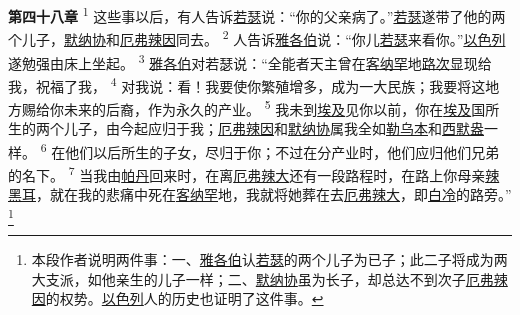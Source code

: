 \textbf{第四十八章\quad}
\textsuperscript{1}
这些事以后，有人告诉\uline{若瑟}说：“你的父亲病了。”\uline{若瑟}遂带了他的两个儿子，\uline{默纳协}和\uline{厄弗辣因}同去。
\textsuperscript{2}
人告诉\uline{雅各伯}说：“你儿\uline{若瑟}来看你。”\uline{以色列}遂勉强由床上坐起。
\textsuperscript{3}
\uline{雅各伯}对若瑟说：“全能者天主曾在\uline{客纳罕}地\uline{路次}显现给我，祝福了我，
\textsuperscript{4}
对我说：看！我要使你繁殖增多，成为一大民族；我要将这地方赐给你未来的后裔，作为永久的产业。
\textsuperscript{5}
我未到\uline{埃及}见你以前，你在\uline{埃及}国所生的两个儿子，由今起应归于我；\uline{厄弗辣因}和\uline{默纳协}属我全如\uline{勒乌本}和\uline{西默盎}一样。
\textsuperscript{6}
在他们以后所生的子女，尽归于你；不过在分产业时，他们应归他们兄弟的名下。
\textsuperscript{7}
当我由\uline{帕丹}回来时，在离\uline{厄弗}\uline{辣大}还有一段路程时，在路上你母亲\uline{辣黑耳}，就在我的悲痛中死在\uline{客纳罕}地，我就将她葬在去\uline{厄弗}\uline{辣大}，即\uline{白冷}的路旁。”
\footnote{本段作者说明两件事：一、\uline{雅各伯}认\uline{若瑟}的两个儿子为已子；此二子将成为两大支派，如他亲生的儿子一样；二、\uline{默纳协}虽为长子，却总达不到次子\uline{厄弗辣因}的权势。\uline{以色列}人的历史也证明了这件事。}

